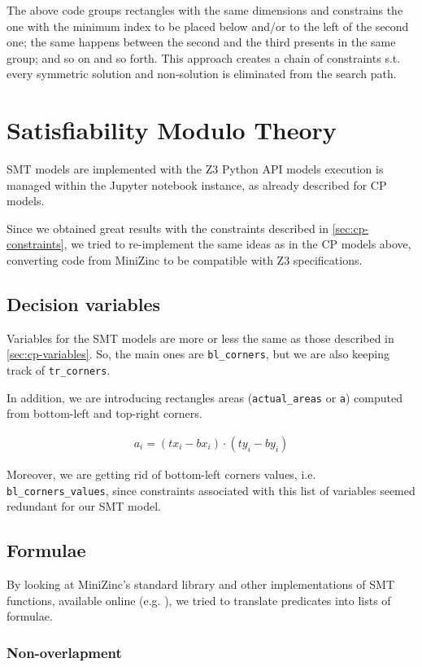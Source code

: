 \documentclass[a4paper,10pt]{article}
\begin{document}
The above code groups rectangles with the same dimensions and constrains the one with the minimum index to be placed below and/or to the left of the second one; the same happens between the second and the third presents in the same group; and so on and so forth. This approach creates a chain of constraints s.t. every symmetric solution and non-solution is eliminated from the search path.

\section{Satisfiability Modulo Theory}
SMT models are implemented with the Z3 Python API models execution is managed within the Jupyter notebook instance, as already described for CP models.

Since we obtained great results with the constraints described in \ref{sec:cp-constraints}, we tried to re-implement the same ideas as in the CP models above, converting code from MiniZinc to be compatible with Z3 specifications.

\subsection{Decision variables}
Variables for the SMT models are more or less the same as those described in \ref{sec:cp-variables}. So, the main ones are \texttt{bl\_corners}, but we are also keeping track of \texttt{tr\_corners}. 

In addition, we are introducing rectangles areas (\texttt{actual\_areas} or \texttt{a}) computed from bottom-left and top-right corners. 

\begin{gather*}
   a_{i} = (tx_{i} - bx_{i}) \cdot (ty_{i} - by_{i})
\end{gather*}

Moreover, we are getting rid of bottom-left corners values, i.e. \texttt{bl\_corners\_values}, since constraints associated with this list of variables seemed redundant for our SMT model.

\subsection{Formulae}
By looking at MiniZinc's standard library \cite{minizinc-lib} and other implementations of SMT functions, available online (e.g. \cite{hakank}), we tried to translate predicates into lists of formulae.

\subsubsection{Non-overlapment}
\end{document}
